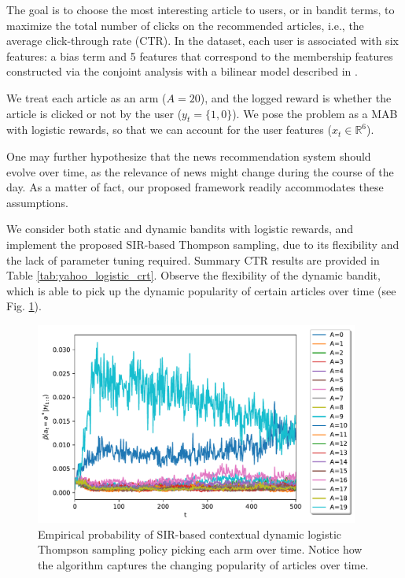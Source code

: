 \documentclass{article}
\def \Real{{\mathbb R}}
\newcommand{\ie}{i.e., }
\begin{document}
The goal is to choose the most interesting article to users, or in bandit terms, to maximize the total number of clicks on the recommended articles, \ie the average click-through rate (CTR). In the dataset, each user is associated with six features: a bias term and 5 features that correspond to the membership features constructed via the conjoint analysis with a bilinear model described in \cite{ip-Chu2009}.

We treat each article as an arm ($A=20$), and the logged reward is whether the article is clicked or not by the user ($y_t=\{1,0\}$). We pose the problem as a MAB with logistic rewards, so that we can account for the user features ($x_t\in \Real^6$).

One may further hypothesize that the news recommendation system should evolve over time, as the relevance of news might change during the course of the day. As a matter of fact, our proposed framework readily accommodates these assumptions.

We consider both static and dynamic bandits with logistic rewards, and implement the proposed SIR-based Thompson sampling, due to its flexibility and the lack of parameter tuning required. Summary CTR results are provided in Table \ref{tab:yahoo_logistic_crt}. Observe the flexibility of the dynamic bandit, which is able to pick up the dynamic popularity of certain articles over time (see Fig. \ref{fig:yahoo_logistic_dynamic}).
 

\begin{figure}[!h]
	\centering
	\includegraphics[width=0.95\textwidth]{./figs/yahoo/yahoo_logistic_dynamic}
	\caption{Empirical probability of SIR-based contextual dynamic logistic Thompson sampling policy picking each arm over time. Notice how the algorithm captures the changing popularity of articles over time.}
	\label{fig:yahoo_logistic_dynamic}
\end{figure}
\end{document}
